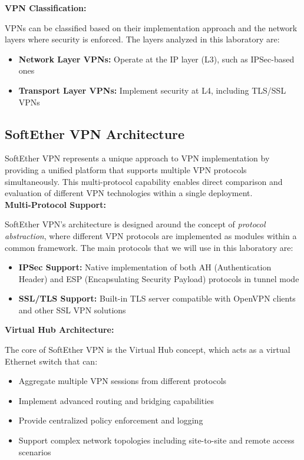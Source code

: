 \noindent
\textbf{VPN Classification:}

\noindent
VPNs can be classified based on their implementation approach and the network layers where security is enforced. The layers analyzed in this laboratory are:

\begin{itemize}
    \item \textbf{Network Layer VPNs:} Operate at the IP layer (L3), such as IPSec-based ones
    \item \textbf{Transport Layer VPNs:} Implement security at L4, including TLS/SSL VPNs
\end{itemize}

\subsection{SoftEther VPN Architecture}

SoftEther VPN represents a unique approach to VPN implementation by providing a unified platform that supports multiple VPN protocols simultaneously. This multi-protocol capability enables direct comparison and evaluation of different VPN technologies within a single deployment.\\

\noindent
\textbf{Multi-Protocol Support:}

\noindent
SoftEther VPN's architecture is designed around the concept of \textit{protocol abstraction}, where different VPN protocols are implemented as modules within a common framework. The main protocols that we will use in this laboratory are:

\begin{itemize}
    \item \textbf{IPSec Support:} Native implementation of both AH (Authentication Header) and ESP (Encapsulating Security Payload) protocols in tunnel mode
    \item \textbf{SSL/TLS Support:} Built-in TLS server compatible with OpenVPN clients and other SSL VPN solutions
\end{itemize}

\noindent
\textbf{Virtual Hub Architecture:}

\noindent
The core of SoftEther VPN is the Virtual Hub concept, which acts as a virtual Ethernet switch that can:

\begin{itemize}
    \item Aggregate multiple VPN sessions from different protocols
    \item Implement advanced routing and bridging capabilities
    \item Provide centralized policy enforcement and logging
    \item Support complex network topologies including site-to-site and remote access scenarios
\end{itemize}

